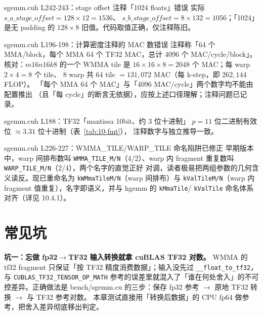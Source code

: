 \begin{kaogu}[F3]{sgemm.cuh L242-243：stage offset 注释「1024 floats」错误}
  实际 $s\_a\_stage\_offset = 128\times12 = 1536$、
  $s\_b\_stage\_offset = 8\times132 = 1056$；「1024」是无 padding 的
  $128\times8$ 旧值。代码取值正确，仅注释陈旧。
\end{kaogu}

\begin{kaogu}[F4]{sgemm.cuh L196-198：计算密度注释的 MAC 数错误}
  注释称「64 个 MMA/block，每个 MMA 64 个 TF32 MAC，总计 4096 个
  MAC/cycle/block」。核对：$m16n16k8$ 的一个 WMMA tile 是
  $16\times16\times8 = 2048$ 个 MAC；每 warp $2\times4=8$ 个 tile、
  8 warp 共 64 tile $= 131{,}072$ MAC（每 k-step，即 $262{,}144$ FLOP）。
  「每个 MMA 64 个 MAC」与「4096 MAC/cycle」两个数字均不能由配置推出
  （且「每 cycle」的断言无依据），应按上述口径理解；注释问题已记录。
\end{kaogu}

\begin{kaogu}[F3 核校通过]{sgemm.cuh L188：TF32「mantissa 10bit、约 3 位十进制」}
  $p=11$ 位二进制有效位 $\approx 3.31$ 位十进制（表~\ref{tab:10-fmt}），
  注释数字与独立推导一致。
\end{kaogu}

\begin{kaogu}[F3 历史注记]{sgemm.cuh L226-227：WMMA\_TILE/WARP\_TILE 命名陷阱已修正}
  早期版本中，warp 间排布数叫 \texttt{WMMA\_TILE\_M/N}（4/2）、warp 内
  fragment 重复数叫 \texttt{WARP\_TILE\_M/N}（2/4），两个名字的直觉正好
  对调，读者极易把两组参数的几何含义读反。现已重命名为
  \texttt{kWMmaTileM/N}（warp 间排布）与 \texttt{kValTileM/N}（warp 内
  fragment 值重复），名字即语义，并与 hgemm 的 \texttt{kMmaTile}/
  \texttt{kValTile} 命名体系对齐（详见 10.4.1）。
\end{kaogu}

\section{常见坑}

\textbf{坑一：忘做 fp32$\to$TF32 输入转换就拿 cuBLAS TF32 对数。}
WMMA 的 tf32 fragment 只保证「按 TF32 精度消费数据」；输入没先过
\texttt{\_\allowbreak{}\_\allowbreak{}float\_\allowbreak{}to\_\allowbreak{}tf32}，与 \texttt{CUBLAS\_\allowbreak{}TF32\_\allowbreak{}TENSOR\_\allowbreak{}OP\_\allowbreak{}MATH}
参考的误差里就混入了「谁在何处舍入」的不可控差异。正确做法是
bench/sgemm.cu 的三步：保存 fp32 参考 $\to$ 原地 TF32 转换 $\to$ 与 TF32 参考对数。
本章测试直接用「转换后数据」的 CPU fp64 做参考，把舍入差异彻底移出判定。


